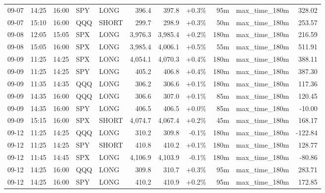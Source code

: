 \documentclass[11pt,a4paper,twoside]{article}
\begin{document}
\begin{center}
\begin{longtable}{>{\color{txtmain}}l l l l l r r r r >{\color{txtmain}}l r}
09-07 & 14:25 & 16:00 & SPY & LONG & 396.4 & 397.8 & \textcolor{wingreen}{+0.3\%} & 95m & max\_time\_180m & \textcolor{wingreen}{328.02} \\
09-07 & 15:10 & 16:00 & QQQ & SHORT & 299.7 & 298.9 & \textcolor{wingreen}{+0.3\%} & 50m & max\_time\_180m & \textcolor{wingreen}{253.57} \\
09-08 & 12:05 & 15:05 & SPX & LONG & 3,976.3 & 3,985.4 & \textcolor{wingreen}{+0.2\%} & 180m & max\_time\_180m & \textcolor{wingreen}{216.59} \\
09-08 & 15:05 & 16:00 & SPX & LONG & 3,985.4 & 4,006.1 & \textcolor{wingreen}{+0.5\%} & 55m & max\_time\_180m & \textcolor{wingreen}{511.91} \\
09-09 & 11:25 & 14:25 & SPX & LONG & 4,054.1 & 4,070.3 & \textcolor{wingreen}{+0.4\%} & 180m & max\_time\_180m & \textcolor{wingreen}{388.11} \\
09-09 & 11:25 & 14:25 & SPY & LONG & 405.2 & 406.8 & \textcolor{wingreen}{+0.4\%} & 180m & max\_time\_180m & \textcolor{wingreen}{387.30} \\
09-09 & 11:35 & 14:35 & QQQ & LONG & 306.2 & 306.6 & \textcolor{wingreen}{+0.1\%} & 180m & max\_time\_180m & \textcolor{wingreen}{117.36} \\
09-09 & 14:35 & 16:00 & QQQ & LONG & 306.6 & 307.0 & \textcolor{wingreen}{+0.1\%} & 85m & max\_time\_180m & \textcolor{wingreen}{120.45} \\
09-09 & 14:35 & 16:00 & SPY & LONG & 406.5 & 406.5 & \textcolor{wingreen}{+0.0\%} & 85m & max\_time\_180m & \textcolor{lossred}{-10.00} \\
09-09 & 15:15 & 16:00 & SPX & SHORT & 4,074.7 & 4,067.4 & \textcolor{wingreen}{+0.2\%} & 45m & max\_time\_180m & \textcolor{wingreen}{168.17} \\
09-12 & 11:25 & 14:25 & QQQ & LONG & 310.2 & 309.8 & \textcolor{lossred}{-0.1\%} & 180m & max\_time\_180m & \textcolor{lossred}{-122.84} \\
09-12 & 11:25 & 14:25 & SPY & SHORT & 410.8 & 410.2 & \textcolor{wingreen}{+0.1\%} & 180m & max\_time\_180m & \textcolor{wingreen}{128.77} \\
09-12 & 11:45 & 14:45 & SPX & LONG & 4,106.9 & 4,103.9 & \textcolor{lossred}{-0.1\%} & 180m & max\_time\_180m & \textcolor{lossred}{-80.86} \\
09-12 & 14:25 & 16:00 & QQQ & LONG & 309.8 & 310.7 & \textcolor{wingreen}{+0.3\%} & 95m & max\_time\_180m & \textcolor{wingreen}{283.71} \\
09-12 & 14:25 & 16:00 & SPY & LONG & 410.2 & 410.9 & \textcolor{wingreen}{+0.2\%} & 95m & max\_time\_180m & \textcolor{wingreen}{172.85} \\

\end{longtable}
\end{center}
\end{document}
